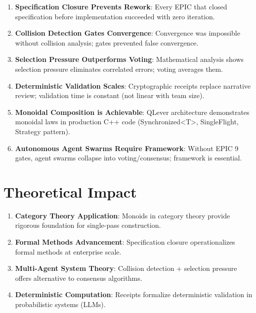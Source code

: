 \documentclass[12pt,oneside,a4paper]{book}
\theoremstyle{definition}
\begin{document}
\begin{enumerate}
  \item \textbf{Specification Closure Prevents Rework}: Every EPIC that closed specification before implementation succeeded with zero iteration.

  \item \textbf{Collision Detection Gates Convergence}: Convergence was impossible without collision analysis; gates prevented false convergence.

  \item \textbf{Selection Pressure Outperforms Voting}: Mathematical analysis shows selection pressure eliminates correlated errors; voting averages them.

  \item \textbf{Deterministic Validation Scales}: Cryptographic receipts replace narrative review; validation time is constant (not linear with team size).

  \item \textbf{Monoidal Composition is Achievable}: QLever architecture demonstrates monoidal laws in production C++ code (Synchronized<T>, SingleFlight, Strategy pattern).

  \item \textbf{Autonomous Agent Swarms Require Framework}: Without EPIC 9 gates, agent swarms collapse into voting/consensus; framework is essential.
\end{enumerate}

\section{Theoretical Impact}
\label{sec:conclusions-theory}

\begin{enumerate}
  \item \textbf{Category Theory Application}: Monoids in category theory provide rigorous foundation for single-pass construction.

  \item \textbf{Formal Methods Advancement}: Specification closure operationalizes formal methods at enterprise scale.

  \item \textbf{Multi-Agent System Theory}: Collision detection + selection pressure offers alternative to consensus algorithms.

  \item \textbf{Deterministic Computation}: Receipts formalize deterministic validation in probabilistic systems (LLMs).
\end{enumerate}
\end{document}
